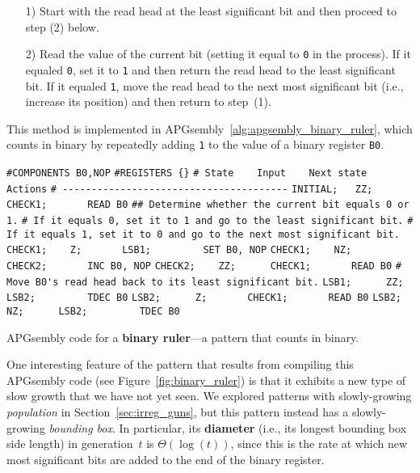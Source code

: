 \begin{enumerate}
	\item[1)] Start with the read head at the least significant bit and then proceed to step (2) below.\smallskip
	
	\item[2)] Read the value of the current bit (setting it equal to \texttt{0} in the process). If it equaled \texttt{0}, set it to \texttt{1} and then return the read head to the least significant bit. If it equaled \texttt{1}, move the read head to the next most significant bit (i.e., increase its position) and then return to step~(1).\smallskip
\end{enumerate}

This method is implemented in APGsembly~\ref{alg:apgsembly_binary_ruler}, which counts in binary by repeatedly adding \texttt{1} to the value of a binary register \texttt{B0}.

\begin{apgsembly}
	\begin{algorithmic}\small
		\State \verb|#COMPONENTS B0,NOP|
		\State \verb|#REGISTERS {}|
		\State \verb|# State    Input    Next state    Actions|
		\State \verb|# ---------------------------------------|
		\State \verb|INITIAL;   ZZ;      CHECK1;       READ B0|
		\State
		\State \verb|## Determine whether the current bit equals 0 or 1.|
		\State \verb|# If it equals 0, set it to 1 and go to the least significant bit.|
		\State \verb|# If it equals 1, set it to 0 and go to the next most significant bit.|
		\State \verb|CHECK1;    Z;       LSB1;         SET B0, NOP|
		\State \verb|CHECK1;    NZ;      CHECK2;       INC B0, NOP|
		\State \verb|CHECK2;    ZZ;      CHECK1;       READ B0|
		\State
		\State \verb|# Move B0's read head back to its least significant bit.|
		\State \verb|LSB1;      ZZ;      LSB2;         TDEC B0|
		\State \verb|LSB2;      Z;       CHECK1;       READ B0|
		\State \verb|LSB2;      NZ;      LSB2;         TDEC B0|
	\end{algorithmic}
	\caption{APGsembly code for a \textbf{binary ruler}---a pattern that counts in binary.}\label{alg:apgsembly_binary_ruler}
\end{apgsembly}

One interesting feature of the pattern that results from compiling this APGsembly code (see Figure~\ref{fig:binary_ruler}) is that it exhibits a new type of slow growth that we have not yet seen. We explored patterns with slowly-growing \emph{population} in Section~\ref{sec:irreg_guns}, but this pattern instead has a slowly-growing \emph{bounding box}. In particular, its \textbf{diameter} (i.e., its longest bounding box side length) in generation~$t$ is $\Theta(\log(t))$, since this is the rate at which new most significant bits are added to the end of the binary register.

